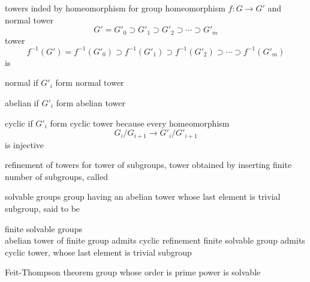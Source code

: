 \documentclass[17pt,landscape]{foils}
\begin{document}
{\begin{myproposition}{towers inded by homeomorphism}%
	for group homeomorphism $f:G\to G'$ and normal tower
	$$
		G' = G'_0
		\supset G'_1
		\supset G'_2
		\supset \cdots
		\supset G'_m
	$$
	tower
	$$
		f^{-1}(G') = f^{-1}(G'_0)
		\supset f^{-1}(G'_1)
		\supset f^{-1}(G'_2)
		\supset \cdots
		\supset f^{-1}(G'_m)
	$$
	is
	\bit
	\item
		normal if $G'_i$ form normal tower
	\item
		abelian if $G'_i$ form abelian tower
	\item
		cyclic if $G'_i$ form cyclic tower
	\eit
	because every homeomorphism
	$$
		G_i / G_{i+1}
		\to
		G'_i / G'_{i+1}
	$$
	is injective
\end{myproposition}



\begin{mydefinition}{refinement of towers}%
	for tower of subgroups,
	tower obtained by inserting finite number of subgroups,
	called 
\end{mydefinition}

\vfill
\begin{mydefinition}{solvable groups}%
	group having an abelian tower whose last element is trivial subgroup,
	said to be %
\end{mydefinition}

\vfill
\begin{myproposition}{finite solvable groups}\ \\
	\shrinkspacewithintheoremsliket
	\ibit
	\iitem
		abelian tower of finite group admits cyclic refinement
	\iitem
		finite solvable group admits cyclic tower, whose last element is trivial subgroup
	\eit
\end{myproposition}

\vfill
\begin{mytheorem}{Feit-Thompson theorem}%
	group whose order is prime power is solvable
\end{mytheorem}

}
\end{document}
